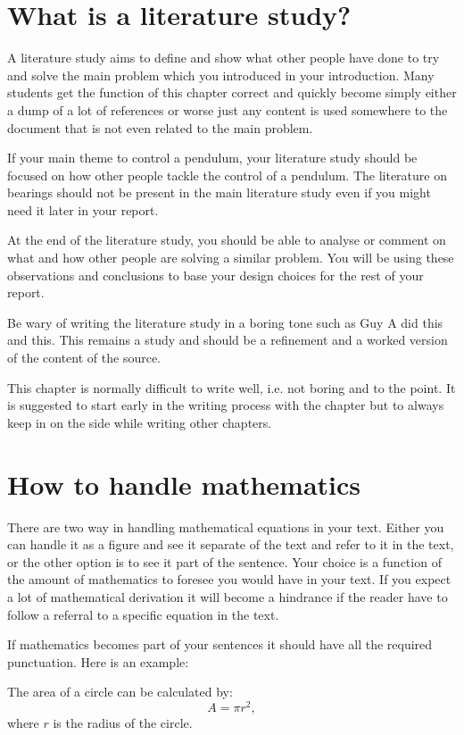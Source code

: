 \documentclass[12pt]{article}
\begin{document}
\section*{What is a literature study?}
A literature study aims to define and show what other people have done to try and solve the main problem which you introduced in your introduction.
Many students get the function of this chapter correct and quickly become simply either a dump of a lot of references or worse just any content is used somewhere to the document that is not even related to the main problem.

If your main theme to control a pendulum, your literature study should be focused on how other people tackle the control of a pendulum.
The literature on bearings should not be present in the main literature study even if you might need it later in your report.

At the end of the literature study, you should be able to analyse or comment on what and how other people are solving a similar problem.  You will be using these observations and conclusions to base your design choices for the rest of your report.

Be wary of writing the literature study in a boring tone such as Guy A did this and this.  This remains a study and should be a refinement and a worked version of the content of the source.

This chapter is normally difficult to write well, i.e. not boring and to the point.  It is suggested to start early in the writing process with the chapter but to always keep in on the side while writing other chapters.


\section*{How to handle mathematics}
There are two way in handling mathematical equations in your text.
Either you can handle it as a figure and see it separate of the text and refer to it in the text, or the other option is to see it part of the sentence.
Your choice is a function of the amount of mathematics to foresee you would have in your text.
If you expect a lot of mathematical derivation it will become a hindrance if the reader have to follow a referral to a specific equation in the text.

If mathematics becomes part of your sentences it should have all the required punctuation.
Here is an example:

The area of a circle can be calculated by:
\begin{equation}
A = \pi r^{2},
\end{equation}
where $r$ is the radius of the circle.
\end{document}
